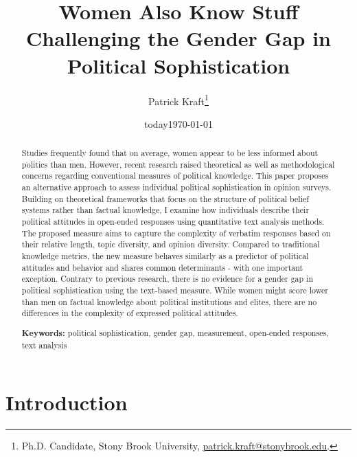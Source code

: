 \documentclass[12pt]{article}
\author{Patrick Kraft\footnote{Ph.D. Candidate, Stony Brook University, \href{mailto:patrick.kraft@stonybrook.edu}{patrick.kraft@stonybrook.edu}.
}}
\date{today}
\title{Women Also Know Stuff\\
\large{Challenging the Gender Gap in Political Sophistication}}
\date{\today}
\begin{document}
\maketitle\doublespacing\thispagestyle{empty}

\begin{abstract}\singlespacing
Studies frequently found that on average, women appear to be less informed about politics than men. However, recent research raised theoretical as well as methodological concerns regarding conventional measures of political knowledge. This paper proposes an alternative approach to assess individual political sophistication in opinion surveys. Building on theoretical frameworks that focus on the structure of political belief systems rather than factual knowledge, I examine how individuals describe their political attitudes in open-ended responses using quantitative text analysis methods. The proposed measure aims to capture the complexity of verbatim responses based on their relative length, topic diversity, and opinion diversity. Compared to traditional knowledge metrics, the new measure behaves similarly as a predictor of political attitudes and behavior and shares common determinants - with one important exception. Contrary to previous research, there is no evidence for a gender gap in political sophistication using the text-based measure. While women might score lower than men on factual knowledge about political institutions and elites, there are no differences in the complexity of expressed political attitudes. %

\vspace{\baselineskip}
\noindent \textbf{Keywords:} political sophistication, gender gap, measurement, open-ended responses, text analysis \\

\end{abstract}
\newpage\setcounter{page}{1}


\section*{Introduction}
\end{document}
